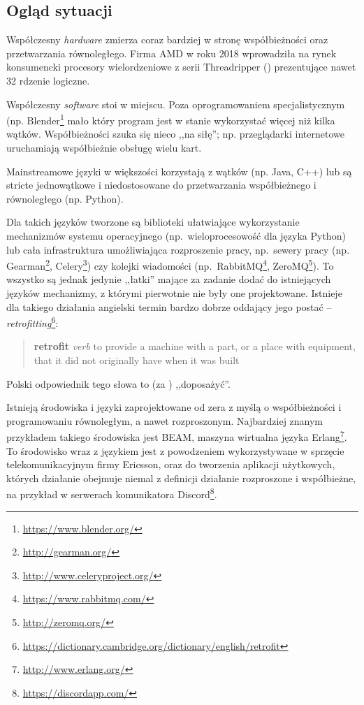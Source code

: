 \subsection{Ogląd sytuacji}

Współczesny \emph{hardware} zmierza coraz bardziej w stronę współbieżności oraz przetwarzania równoległego.
Firma AMD w roku 2018 wprowadziła na rynek konsumencki procesory wielordzeniowe z serii
Threadripper (\cite{AmdProductThreadripper}) prezentujące nawet 32 rdzenie logiczne.

Współczesny \emph{software} stoi w miejscu. Poza oprogramowaniem specjalistycznym (np.
Blender\footnote{\url{https://www.blender.org/}} mało który program jest w stanie wykorzystać więcej niż
kilka wątków. Współbieżności szuka się nieco ,,na siłę''; np. przeglądarki internetowe uruchamiają
współbieżnie obsługę wielu kart.

Mainstreamowe języki w większości korzystają z wątków (np. Java, C++) lub są stricte jednowątkowe i
niedostosowane do przetwarzania współbieżnego i równoległego (np. Python).

Dla takich języków tworzone są biblioteki ułatwiające wykorzystanie mechanizmów systemu operacyjnego
(np.~wieloprocesowość dla języka Python) lub cała infrastruktura umożliwiająca rozproszenie pracy,
np.~sewery pracy (np. Gearman\footnote{\url{http://gearman.org/}},
Celery\footnote{\url{http://www.celeryproject.org/}}) czy kolejki wiadomości
(np.~RabbitMQ\footnote{\url{https://www.rabbitmq.com/}}, ZeroMQ\footnote{\url{http://zeromq.org/}}).
To wszystko są jednak jedynie ,,łatki'' mające za zadanie dodać do istniejących języków mechanizmy, z którymi
pierwotnie nie były one projektowane. Istnieje dla takiego działania angielski termin bardzo dobrze oddający
jego postać --
\emph{retrofitting}\footnote{\url{https://dictionary.cambridge.org/dictionary/english/retrofit}}:

\begin{quote}
    \textbf{retrofit}
    \newline
    \emph{verb}
    \newline
    to provide a machine with a part, or a place with equipment, that it did not originally have when it was
    built
\end{quote}

Polski odpowiednik tego słowa to (za \cite{PWNAngielskoPolskiRetrofit}) ,,doposażyć''.

Istnieją środowiska i języki zaprojektowane od zera z myślą o współbieżności i programowaniu równoległym, a
nawet rozproszonym.
Najbardziej znanym przykładem takiego środowiska jest BEAM, maszyna wirtualna języka
Erlang\footnote{\url{http://www.erlang.org/}}. To środowisko wraz z językiem jest z powodzeniem wykorzystywane
w sprzęcie telekomunikacyjnym firmy Ericsson, oraz do tworzenia aplikacji użytkowych, których działanie
obejmuje niemal z definicji działanie rozproszone i współbieżne, na przykład w serwerach komunikatora
Discord\footnote{\url{https://discordapp.com/}}.

